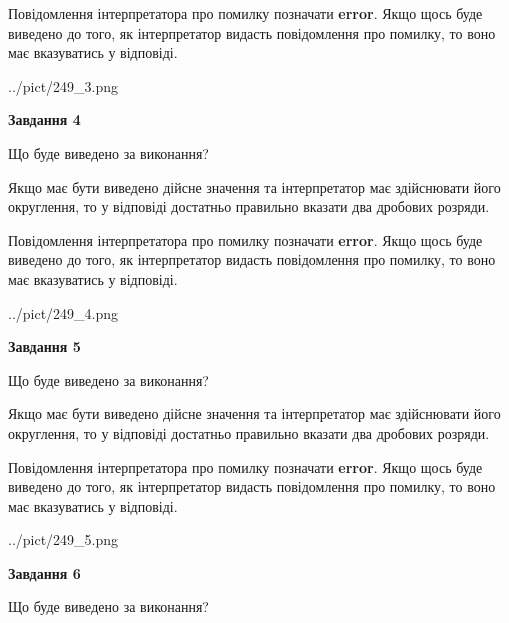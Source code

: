 \documentclass[12pt, ukrainian]{article}
\begin{document}
{\begin {Large}
Повідомлення інтерпретатора про помилку позначати \textbf{error}.
Якщо щось буде виведено до того, як інтерпретатор видасть повідомлення про помилку, 
то воно має вказуватись у відповіді. \par

\begin{center}
	{../pict/249_3.png}
\end{center}
\newpage

{\begin {center}\textbf{Завдання 4}\end {center}}\par
Що буде виведено за виконання? \par

Якщо має бути виведено дійсне значення та інтерпретатор має здійснювати його округлення, 
то у відповіді достатньо правильно вказати два дробових розряди.

Повідомлення інтерпретатора про помилку позначати \textbf{error}.
Якщо щось буде виведено до того, як інтерпретатор видасть повідомлення про помилку, 
то воно має вказуватись у відповіді. \par

\begin{center}
	{../pict/249_4.png}
\end{center}
\newpage

{\begin {center}\textbf{Завдання 5}\end {center}}\par
Що буде виведено за виконання? \par

Якщо має бути виведено дійсне значення та інтерпретатор має здійснювати його округлення, 
то у відповіді достатньо правильно вказати два дробових розряди.

Повідомлення інтерпретатора про помилку позначати \textbf{error}.
Якщо щось буде виведено до того, як інтерпретатор видасть повідомлення про помилку, 
то воно має вказуватись у відповіді. \par

\begin{center}
	{../pict/249_5.png}
\end{center}
\newpage

{\begin {center}\textbf{Завдання 6}\end {center}}\par
Що буде виведено за виконання? \par


\end{Large}}
\end{document}
